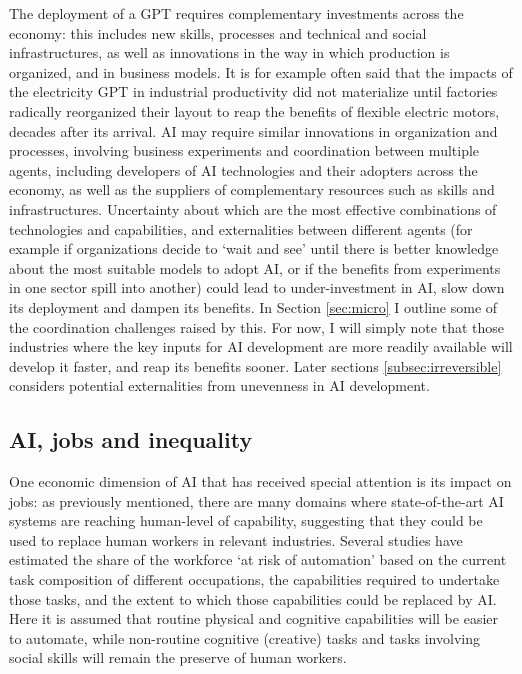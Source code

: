 \documentclass[11pt]{article}
\begin{document}
The deployment of a GPT requires complementary investments across the economy: this includes new skills, processes and technical and social infrastructures, as well as innovations in the way in which production is organized, and in business models. It is for example often said that the impacts of the electricity GPT in industrial productivity did not materialize until factories radically reorganized their layout to reap the benefits of flexible electric motors, decades after its arrival. AI may require similar innovations in organization and processes, involving business experiments and coordination between multiple agents, including developers of AI technologies and their adopters across the economy, as well as the suppliers of complementary resources such as skills and infrastructures. Uncertainty about which are the most effective combinations of technologies and capabilities, and externalities between different agents (for example if organizations decide to `wait and see' until there is better knowledge about the most suitable models to adopt AI, or if the benefits from experiments in one sector spill into another) could lead to under-investment in AI, slow down its deployment and dampen its benefits. In Section \ref{sec:micro} I outline some of the coordination challenges raised by this. For now, I will simply note that those industries where the key inputs for AI development are more readily available will develop it faster, and reap its benefits sooner. Later sections \ref{subsec:irreversible} considers potential externalities from unevenness in AI development.

\subsection{AI, jobs and inequality}
\label{subsec:jobs}
One economic dimension of AI that has received special attention is its impact on jobs: as previously mentioned, there are many domains where state-of-the-art AI systems are reaching human-level of capability,  suggesting that they could be used to replace human workers in relevant industries. Several studies have estimated the share of the workforce `at risk of automation' based on the current task composition of different occupations, the capabilities required to undertake those tasks, and the extent to which those capabilities could be replaced by AI. Here it is assumed that routine physical and cognitive capabilities will be easier to automate, while non-routine cognitive (creative) tasks and tasks involving social skills will remain the preserve of human workers. 
\end{document}
